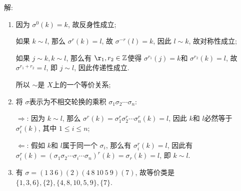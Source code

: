 \documentclass[a4paper,12pt]{ctexart}
\newcommand{\Z}{\mathbb{Z}}
\begin{document}
  解: \begin{enumerate}[label=(\arabic{*})]
    \item 因为 $ \sigma^0(k)=k $, 故反身性成立;
    
    如果 $ k\sim l $, 那么 $ \sigma^r(k)=l $, 故 $ \sigma^{-r}(l)=k $, 因此 $ l\sim k $, 故对称性成立;
    
    如果 $ j\sim k,k\sim l $, 那么有 $ \r_1,r_2\in\Z $使得 $ \sigma^{r_1}(j)=k $和 $ \sigma^{r_2}(k)=l $, 
    故 $ \sigma^{r_1+r_2}=l $, 即 $ j\sim l  $, 因此传递性成立.
    
    所以 $ \sim $是 $ X $上的一个等价关系;
    \item 将 $ \sigma $表示为不相交轮换的乘积 $ \sigma_1\sigma_2\cdots\sigma_n $:

    $ \Rightarrow $: 因为 $ k\sim l  $, 那么 $ \sigma^r(k)=\sigma_1^r\sigma_2^r\cdots\sigma_n^r(k)=l $, 因此 $ k $和
    $ l $必然等于 $ \sigma_i^r(k) $, 其中 $ 1\le i\le n $;

    $ \Leftarrow $: 假如 $ k $和 $ l $属于同一个 $ \sigma_i $, 那么有 $ \sigma_i^r(k)=l $, 
    因此有 $ \sigma_i^r(k)=(\sigma_1\sigma_2\cdots\sigma_i\cdots\sigma_n)^r(k)=\sigma_r(k)=l $, 即 $ k\sim l $.
    \item 有 $ \sigma=(1~3~6)(2)(4~8~10~5~9)(7) $, 故等价类是 $ \{1,3,6\},\{2\},\{4,8,10,5,9\},\{7\} $.
  \end{enumerate}
\end{document}
